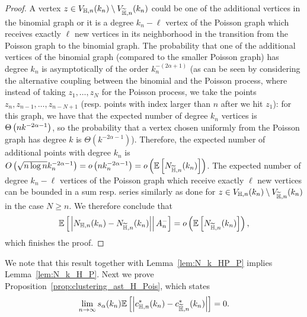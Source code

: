 \begin{proof}
A vertex $z \in V_{\mathbb{H},n}(k_n) \setminus V_{\widetilde{\mathbb{H}},n}(k_n)$ could be one of the additional vertices in the binomial graph or it is a degree $k_n-\ell$ vertex of the Poisson graph which receives exactly $\ell$ new vertices in its neighborhood in the transition from the Poisson graph to the binomial graph. The probability that one of the additional vertices of the binomial graph (compared to the smaller Poisson graph) has degree $k_n$ is asymptotically of the order $k_n^{-(2\alpha+1)}$ (as can be seen by considering the alternative coupling between the binomial and the Poisson process, where instead of taking $z_1, \dots, z_N$ for the Poisson process, we take the points $z_n, z_{n-1}, \dots, z_{n-N+1}$ (resp. points with index larger than $n$ after we hit $z_1$):
 for this graph, we have that the expected number of degree $k_n$ vertices is $\Theta\left(n k^{-2\alpha-1}\right)$, so the probability that a vertex chosen uniformly from the Poisson graph has degree $k$ is $\Theta(k^{-2\alpha-1})$). Therefore, the expected number of additional points with degree $k_n$ is $O\left(\sqrt{n\log n} k_n^{-2\alpha-1}\right) = o\left(n k_n^{-2\alpha-1}\right) = o\left(\mathbb{E}\left[N_{\widetilde{\mathbb{H}},n}(k_n)\right]\right)$. The expected number of degree $k_n-\ell$ vertices of the Poisson graph which receive exactly $\ell$ new vertices can be bounded in a sum resp. series similarly as done for $z \in V_{\mathbb{H},n}(k_n) \setminus V_{\widetilde{\mathbb{H}},n}(k_n)$ in the case $N \geq n$. We therefore conclude that
\[
	\mathbb{E}\left[\left.\left|N_{\mathbb{H},n}(k_n)-N_{\widetilde{\mathbb{H}},n}(k_n)\right|\right|A_n^{-}\right] = o\left(\mathbb{E}\left[N_{\widetilde{\mathbb{H}},n}(k_n)\right]\right),
\]
which finishes the proof.
\end{proof}

We note that this result together with Lemma~\ref{lem:N_k_HP_P} implies Lemma~\ref{lem:N_k_H_P}. Next we prove Proposition~\ref{prop:clustering_ast_H_Pois}, which states
\[
	\lim_{n \to \infty} s_\alpha(k_n)\mathbb{E}\left[\left|c_{\mathbb{H},n}^\ast(k_n) - c_{\widetilde{\mathbb{H}},n}^\ast(k_n)\right|\right] = 0.
\]

